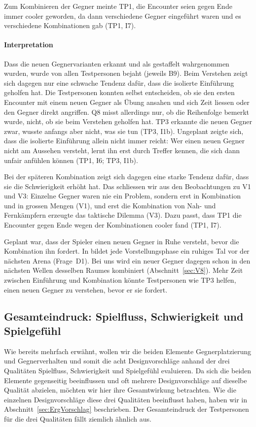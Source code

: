 \documentclass[../Main.tex]{subfiles}
\begin{document}
Zum Kombinieren der Gegner meinte TP1, die Encounter seien gegen Ende immer cooler geworden, da dann verschiedene Gegner eingeführt waren und es verschiedene Kombinationen gab (TP1, I7).

\paragraph{Interpretation}
Dass die neuen Gegnervarianten erkannt und als gestaffelt wahrgenommen wurden, wurde von allen Testpersonen bejaht (jeweils B9). Beim Verstehen zeigt sich dagegen nur eine schwache Tendenz dafür, dass die isolierte Einführung geholfen hat. Die Testpersonen konnten selbst entscheiden, ob sie den ersten Encounter mit einem neuen Gegner als Übung ansahen und sich Zeit liessen oder den Gegner direkt angriffen. Q8 misst allerdings nur, ob die Reihenfolge bemerkt wurde, nicht, ob sie beim Verstehen geholfen hat. TP3 erkannte die neuen Gegner zwar, wusste anfangs aber nicht, was sie tun (TP3, I1b). Ungeplant zeigte sich, dass die isolierte Einführung allein nicht immer reicht: Wer einen neuen Gegner nicht am Aussehen versteht, lernt ihn erst durch Treffer kennen, die sich dann unfair anfühlen können (TP1, I6; TP3, I1b).

Bei der späteren Kombination zeigt sich dagegen eine starke Tendenz dafür, dass sie die Schwierigkeit erhöht hat. Das schliessen wir aus den Beobachtungen zu V1 und V3: Einzelne Gegner waren nie ein Problem, sondern erst in Kombination und in grossen Mengen (V1), und erst die Kombination von Nah- und Fernkämpfern erzeugte das taktische Dilemma (V3). Dazu passt, dass TP1 die Encounter gegen Ende wegen der Kombinationen cooler fand (TP1, I7).

Geplant war, dass der Spieler einen neuen Gegner in Ruhe versteht, bevor die Kombination ihn fordert. In  bildet jede Vorstellungsphase ein ruhiges Tal vor der nächsten Arena (Frage~D1). Bei uns wird ein neuer Gegner dagegen schon in den nächsten Wellen desselben Raumes kombiniert (Abschnitt~\ref{sec:V8}). Mehr Zeit zwischen Einführung und Kombination könnte Testpersonen wie TP3 helfen, einen neuen Gegner zu verstehen, bevor er sie fordert.

\subsection{Gesamteindruck: Spielfluss, Schwierigkeit und Spielgefühl} \label{sec:Gesamteindruck} \label{sec:ErgAllgemein}

Wie bereits mehrfach erwähnt, wollen wir die beiden Elemente Gegnerplatzierung und Gegnerverhalten und somit die acht Designvorschläge anhand der drei Qualitäten Spielfluss, Schwierigkeit und Spielgefühl evaluieren. Da sich die beiden Elemente gegenseitig beeinflussen und oft mehrere Designvorschläge auf dieselbe Qualität abzielen, möchten wir hier ihre Gesamtwirkung betrachten. Wie die einzelnen Designvorschläge diese drei Qualitäten beeinflusst haben, haben wir in Abschnitt~\ref{sec:ErgVorschlag} beschrieben. Der Gesamteindruck der Testpersonen für die drei Qualitäten fällt ziemlich ähnlich aus.
\end{document}
